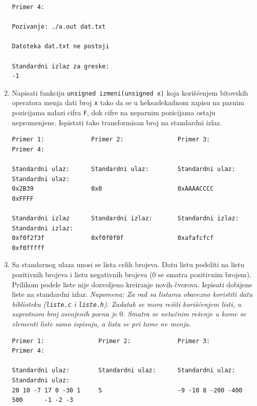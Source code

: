 \begin{enumerate}
\begin{verbatim}
Primer 4:  
                                           
Pozivanje: ./a.out dat.txt              
                        
Datoteka dat.txt ne postoji
                            
Standardni izlaz za greske: 
-1                                                                                                                                        
\end{verbatim}

\item Napisati funkciju \texttt{unsigned izmeni(unsigned x)} koja korišćenjem bitovskih operatora menja dati broj \texttt{x} tako da se u heksadekadnom zapisu na parnim pozicijama nalazi cifra \texttt{F}, dok cifre na neparnim pozicijama ostaju nepromenjene. Ispistati tako transformisan broj na standardni izlaz.

\begin{verbatim}
Primer 1:             Primer 2:               Primer 3:               Primer 4:

Standardni ulaz:      Standardni ulaz:        Standardni ulaz:        Standardni ulaz:
0x2B39                0x0                     0xAAAACCCC              0xFFFF

Standardni izlaz      Standardni izlaz:       Standardni izlaz:       Standardni izlaz:
0xf0f2f3f             0xf0f0f0f               0xafafcfcf              0xf0fffff
\end{verbatim} 

\item Sa standarnog ulaza unosi se lista celih brojeva. Datu listu podeliti na listu pozitivnih brojeva i listu negativnih brojeva
      (0 se smatra pozitivnim brojem). Prilikom podele liste nije dozvoljeno kreiranje novih čvorova. Ispisati dobijene liste na
      standardni izlaz. 
      {\em Napomena: Za rad sa listama obavezno koristiti datu biblioteku 
      ({\tt liste.c} i {\tt liste.h}). Zadatak se mora rešiti korišćenjem listi, u suprotnom broj osvojenih poena je $0$.
      Smatra se netačnim rešenje u kome se elementi liste samo ispisuju, a lista se pri tome ne menja.}
\begin{verbatim}
Primer 1:               Primer 2:             Primer 3:                   Primer 4:   

Standardni ulaz:        Standardni ulaz:      Standardni ulaz:            Standardni ulaz:
20 10 -7 17 0 -30 1     5                     -9 -10 8 -200 -400 500      -1 -2 -3


\end{verbatim}
\end{enumerate}

